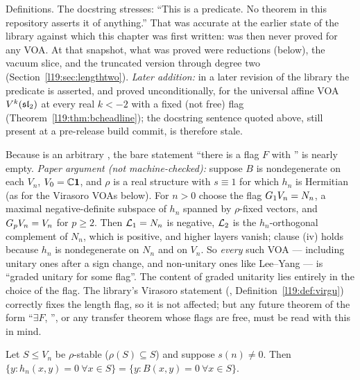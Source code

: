 \begin{status}
Definitions. The docstring stresses: ``This is a predicate. No theorem in this repository asserts
it of anything.'' That was accurate at the earlier state of the library against which this chapter was first written:
 was then never proved for any VOA. At that snapshot, what was proved were reductions (below), the vacuum slice, and the truncated
version through degree two (Section~\ref{l19:sec:lengthtwo}). \emph{Later addition:} in a later revision of the library
the predicate is asserted, and proved unconditionally, for the universal affine VOA $V^k(\mathfrak{sl}_2)$ at every real
$k<-2$ with a fixed (not free) flag (Theorem~\ref{l19:thm:bcheadline}); the docstring sentence quoted above, still
present at a pre-release build commit, is therefore stale.
\end{status}

\begin{warning}[title={The abstract predicate is only as meaningful as the flag supplied}]\label{l19:warn:freeflag}
Because  is an arbitrary , the bare statement ``there is a flag $F$ with
'' is nearly empty. \emph{Paper argument (not machine-checked):} suppose $B$
is nondegenerate on each $V_n$, $V_0 = {\mathbb{C}}\mathbf{1}$, and $\rho$ is a real structure with $s\equiv1$
for which $h_n$ is Hermitian (as for the Virasoro VOAs below). For $n>0$ choose the flag
$G_1V_n = N_n$, a maximal negative-definite subspace of $h_n$ spanned by $\rho$-fixed vectors,
and $G_pV_n = V_n$ for $p\ge2$. Then $\mathcal{L}_1 = N_n$ is negative, $\mathcal{L}_2$ is
the $h_n$-orthogonal complement of $N_n$, which is positive, and higher layers vanish; clause (iv)
holds because $h_n$ is nondegenerate on $N_n$ and on $V_n$. So \emph{every} such VOA --- including
unitary ones after a sign change, and non-unitary ones like Lee--Yang --- is ``graded unitary for some
flag''. The content of graded unitarity lies entirely in the choice of the flag. The library's
Virasoro statement (, Definition~\ref{l19:def:virgu}) correctly fixes the
length flag, so it is not affected; but any future theorem of the form
``$\exists F$, '', or any transfer theorem whose flags are free, must be read with
this in mind.
\end{warning}

\begin{theorem}\label{l19:thm:orthsame}
Let $S\le V_n$ be $\rho$-stable ($\rho(S)\subseteq S$) and suppose $s(n)\ne0$. Then
$\{y : h_n(x,y) = 0\ \forall x\in S\} = \{y : B(x,y) = 0\ \forall x\in S\}$.
\end{theorem}

